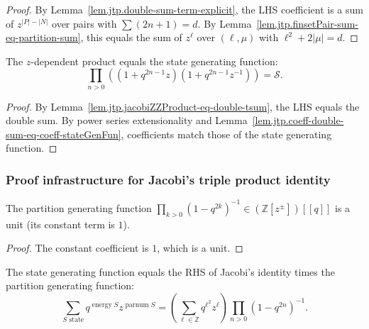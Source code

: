 \begin{proof}
By Lemma~\ref{lem.jtp.double-sum-term-explicit}, the LHS coefficient
is a sum of $z^{|P|-|N|}$ over pairs with $\sum(2n+1) = d$.
By Lemma~\ref{lem.jtp.finsetPair-sum-eq-partition-sum}, this equals the
sum of $z^\ell$ over $(\ell,\mu)$ with $\ell^2 + 2|\mu| = d$.
\end{proof}

\begin{lemma}
\label{lem.jtp.jacobiZZProduct-eq-stateGenFun}
\leanhelper
\leanok
The $z$-dependent product equals the state generating function:
\[
\prod_{n>0}((1+q^{2n-1}z)(1+q^{2n-1}z^{-1})) = \mathcal{S}.
\]
\end{lemma}

\begin{proof}
\leanok
By Lemma~\ref{lem.jtp.jacobiZZProduct-eq-double-tsum}, the LHS equals the double sum.
By power series extensionality and Lemma~\ref{lem.jtp.coeff-double-sum-eq-coeff-stateGenFun},
coefficients match those of the state generating function.
\end{proof}

\subsubsection{Proof infrastructure for Jacobi's triple product identity}

\begin{lemma}
\label{lem.jtp.partitionGenFunJacobi-isUnit}
\leanhelper
\leanok
The partition generating function
$\prod_{k>0}(1-q^{2k})^{-1}\in(\mathbb{Z}[z^{\pm}])[[q]]$
is a unit (its constant term is $1$).
\end{lemma}

\begin{proof}
\leanok
The constant coefficient is $1$, which is a unit.
\end{proof}

\begin{lemma}
\label{lem.jtp.stateGenFun-eq-rhs}
\leanhelper
\leanok
The state generating function equals the RHS of Jacobi's identity
times the partition generating function:
\[
\sum_{S\text{ state}}q^{\operatorname{energy}S}z^{\operatorname{parnum}S}
=\left(\sum_{\ell\in\mathbb{Z}}q^{\ell^{2}}z^{\ell}\right)
\prod_{n>0}(1-q^{2n})^{-1}.
\]
\end{lemma}

